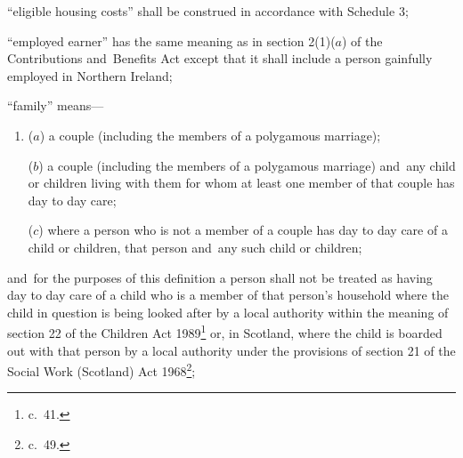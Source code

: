 \documentclass[12pt,a4paper]{article}
\begin{document}
\begin{enumerate}
“eligible housing costs” shall be construed in accordance with Schedule 3;

“employed earner” has the same meaning as in section 2(1)($a$) of the Contributions and~Benefits Act
except that it shall include a person gainfully employed in Northern Ireland;  %

%

“family” means—
\begin{enumerate}\item[]
($a$) 
a couple  %
(including the members of a polygamous marriage);

($b$) 
a couple  %
(including the members of a polygamous marriage) and~any child or children living with them for whom at least one member of that couple has day to day care;

($c$) where a person who is not a member of 
a couple  %
has day to day care of a child or children, that person and~any such child or children;
\end{enumerate}
and~for the purposes of this definition a person shall not be treated as having day to day care of a child who is a member of that person’s household where the child in question is being looked after by a local authority within the meaning of section 22 of the Children Act 1989\footnote{ c.~41.} or, in Scotland, where the child is boarded out with that person by a local authority under the provisions of section 21 of the Social Work (Scotland) Act 1968\footnote{ c.~49.};


\end{enumerate}
\end{document}
